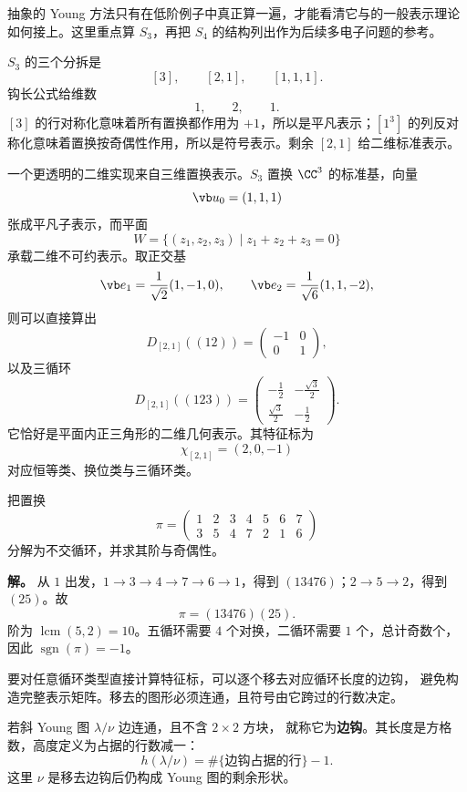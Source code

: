 抽象的 Young 方法只有在低阶例子中真正算一遍，才能看清它与的一般表示理论如何接上。这里重点算 $S_3$，再把 $S_4$ 的结构列出作为后续多电子问题的参考。

$S_3$ 的三个分拆是
\[
[3],\qquad[2,1],\qquad[1,1,1].
\]
钩长公式给维数
\[
1,\qquad2,\qquad1.
\]
$[3]$ 的行对称化意味着所有置换都作用为 $+1$，所以是平凡表示；$[1^3]$ 的列反对称化意味着置换按奇偶性作用，所以是符号表示。剩余 $[2,1]$ 给二维标准表示。

一个更透明的二维实现来自三维置换表示。$S_3$ 置换 $\CC^3$ 的标准基，向量
\[
\vb u_0=(1,1,1)
\]
张成平凡子表示，而平面
\[
W=\{(z_1,z_2,z_3)\mid z_1+z_2+z_3=0\}
\]
承载二维不可约表示。取正交基
\[
\vb e_1=\frac1{\sqrt2}(1,-1,0),
\qquad
\vb e_2=\frac1{\sqrt6}(1,1,-2),
\]
则可以直接算出
\[
D_{[2,1]}((12))=
\begin{pmatrix}-1&0\\0&1\end{pmatrix},
\]
以及三循环
\[
D_{[2,1]}((123))=
\begin{pmatrix}
-\tfrac12&-\tfrac{\sqrt3}{2}\\
\tfrac{\sqrt3}{2}&-\tfrac12
\end{pmatrix}.
\]
它恰好是平面内正三角形的二维几何表示。其特征标为
\[
\chi_{[2,1]}=(2,0,-1)
\]
对应恒等类、换位类与三循环类。

\begin{workedexample}
把置换
\[
\pi=\begin{pmatrix}
1&2&3&4&5&6&7\\
3&5&4&7&2&1&6
\end{pmatrix}
\]
分解为不交循环，并求其阶与奇偶性。

\textbf{解。} 从 $1$ 出发，$1\to3\to4\to7\to6\to1$，得到 $(13476)$；$2\to5\to2$，得到 $(25)$。故
\[
\pi=(13476)(25).
\]
阶为 $\operatorname{lcm}(5,2)=10$。五循环需要 $4$ 个对换，二循环需要 $1$ 个，总计奇数个，因此 $\operatorname{sgn}(\pi)=-1$。
\end{workedexample}


要对任意循环类型直接计算特征标，可以逐个移去对应循环长度的边钩，
避免构造完整表示矩阵。移去的图形必须连通，且符号由它跨过的行数决定。

\begin{definition}[边钩与高度]
若斜 Young 图 $\lambda/\nu$ 边连通，且不含 $2\times2$ 方块，
就称它为\textbf{边钩}。其长度是方格数，高度定义为占据的行数减一：
\[
h(\lambda/\nu)=\#\{\text{边钩占据的行}\}-1.
\]
这里 $\nu$ 是移去边钩后仍构成 Young 图的剩余形状。
\end{definition}

